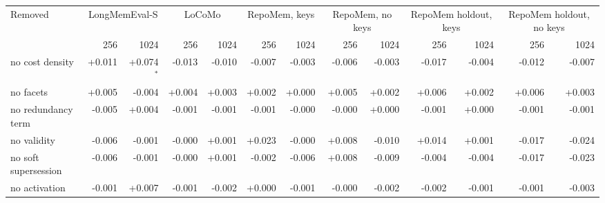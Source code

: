 \begin{tabular}{@{}lrrrrrrrrrrrr@{}}\toprule
Removed & \multicolumn{2}{c}{LongMemEval-S} & \multicolumn{2}{c}{LoCoMo} & \multicolumn{2}{c}{RepoMem, keys} & \multicolumn{2}{c}{RepoMem, no keys} & \multicolumn{2}{c}{RepoMem holdout, keys} & \multicolumn{2}{c}{RepoMem holdout, no keys} \\
 & 256 & 1024 & 256 & 1024 & 256 & 1024 & 256 & 1024 & 256 & 1024 & 256 & 1024 \\\midrule
no cost density & +0.011 & +0.074$^{*}$ & -0.013 & -0.010 & -0.007 & -0.003 & -0.006 & -0.003 & -0.017 & -0.004 & -0.012 & -0.007 \\
no facets & +0.005 & -0.004 & +0.004 & +0.003 & +0.002 & +0.000 & +0.005 & +0.002 & +0.006 & +0.002 & +0.006 & +0.003 \\
no redundancy term & -0.005 & +0.004 & -0.001 & -0.001 & -0.001 & -0.000 & -0.000 & +0.000 & -0.001 & +0.000 & -0.001 & -0.001 \\
no validity & -0.006 & -0.001 & -0.000 & +0.001 & +0.023 & -0.000 & +0.008 & -0.010 & +0.014 & +0.001 & -0.017 & -0.024 \\
no soft supersession & -0.006 & -0.001 & -0.000 & +0.001 & -0.002 & -0.006 & +0.008 & -0.009 & -0.004 & -0.004 & -0.017 & -0.023 \\
no activation & -0.001 & +0.007 & -0.001 & -0.002 & +0.000 & -0.001 & -0.000 & -0.002 & -0.002 & -0.001 & -0.001 & -0.003 \\
\bottomrule\end{tabular}